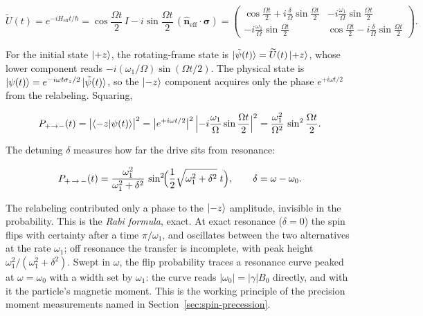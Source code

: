 \begin{linenomath}
    \begin{equation*}
        \widetilde{U}(t) = e^{-iH_{\mathrm{eff}}t/\hbar}
        = \cos\frac{\Omega t}{2}\,I
          - i\sin\frac{\Omega t}{2}\,(\hat{\bm n}_{\mathrm{eff}}\!\cdot\!\bm\sigma)
        = \begin{pmatrix}
            \cos\frac{\Omega t}{2} + i\frac{\delta}{\Omega}\sin\frac{\Omega t}{2}
            & -i\frac{\omega_1}{\Omega}\sin\frac{\Omega t}{2} \\[6pt]
            -i\frac{\omega_1}{\Omega}\sin\frac{\Omega t}{2}
            & \cos\frac{\Omega t}{2} - i\frac{\delta}{\Omega}\sin\frac{\Omega t}{2}
        \end{pmatrix}.
    \end{equation*}
\end{linenomath}
For the initial state $\ket{+z}$, the rotating-frame state is $\ket{\tilde\psi(t)} = \widetilde{U}(t)\ket{+z}$, whose lower component reads $-i(\omega_1/\Omega)\sin(\Omega t/2)$. The physical state is $\ket{\psi(t)} = e^{-i\omega t\sigma_z/2}\ket{\tilde\psi(t)}$, so the $\ket{-z}$ component acquires only the phase $e^{+i\omega t/2}$ from the relabeling. Squaring,
\begin{linenomath}
    \begin{equation*}
        P_{+\to-}(t) = \bigl|\braket{-z|\psi(t)}\bigr|^{2}
        = \bigl|e^{+i\omega t/2}\bigr|^{2}\,
          \Bigl|-i\frac{\omega_1}{\Omega}\sin\frac{\Omega t}{2}\Bigr|^{2}
        = \frac{\omega_1^2}{\Omega^{2}}\,\sin^{2}\frac{\Omega t}{2} .
    \end{equation*}
\end{linenomath}
The detuning $\delta$ measures how far the drive sits from resonance:
\begin{linenomath}
    \begin{equation}
        P_{+\,\to\,-}(t) = \frac{\omega_1^2}{\omega_1^2 + \delta^2}\,\sin^2\!\Bigl(\frac{1}{2}\sqrt{\omega_1^2 + \delta^2}\;t\Bigr), \qquad \delta = \omega - \omega_0 .
        \label{eq:rabi-formula}
    \end{equation}
\end{linenomath}
The relabeling contributed only a phase to the $\ket{-z}$ amplitude, invisible in the probability.
This is the \emph{Rabi formula}, exact. At exact resonance ($\delta = 0$) the spin flips with certainty after a time $\pi/\omega_1$, and oscillates between the two alternatives at the rate $\omega_1$; off resonance the transfer is incomplete, with peak height $\omega_1^2/(\omega_1^2 + \delta^2)$. Swept in $\omega$, the flip probability traces a resonance curve peaked at $\omega = \omega_0$ with a width set by $\omega_1$: the curve reads $|\omega_0| = |\gamma| B_0$ directly, and with it the particle's magnetic moment. This is the working principle of the precision moment measurements named in Section~\ref{sec:spin-precession}.

